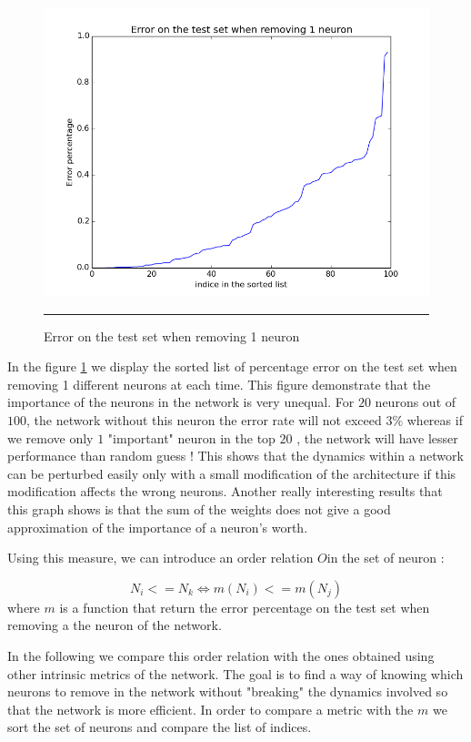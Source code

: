 \begin{figure}[htbp]
    \centering
    \includegraphics[scale=0.8]{Figures/error_test_set_remove_neuron.png}
    \rule{35em}{0.5pt}
    \caption[Error on the test set when removing 1 neuron]{Error on the test set when removing 1 neuron}
    \label{fig:error_one_neuron}
\end{figure}

In the figure \ref{fig:error_one_neuron} we display the sorted list of percentage error on the test set when removing 1 different neurons at each time. This figure demonstrate that the importance of the neurons in the network is very unequal. For $20$ neurons out of $100$, the network without this neuron the error rate will not exceed $3\%$ whereas if we remove only $1$ "important" neuron in the top $20$ , the network will have lesser performance than random guess ! This shows that the dynamics within a network can be perturbed easily only with a small modification of the architecture if this modification affects the wrong neurons. Another really interesting results that this graph shows is that the sum of the weights does not give a good approximation of the importance of a neuron's worth.

Using this measure, we can introduce an order relation $O$in the set of neuron : 

$$ N_i <= N_k \Leftrightarrow m(N_i) <= m(N_j) $$ where $m$ is a function that return the error percentage on the test set when removing a the neuron of the network.

In the following we compare this order relation with the ones obtained using other intrinsic metrics of the network. The goal is to find a way of knowing which neurons to remove in the network without "breaking" the dynamics involved so that the network is more efficient. In order to compare a metric with the $m$ we sort the set of neurons and compare the list of indices. 

